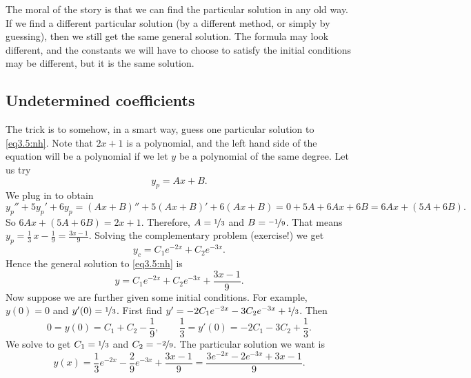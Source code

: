 The moral of the story is that we can find the particular solution in any old
way.  If we find a different particular solution (by a different method,
or simply by guessing),
then we still get the same general solution.
The formula may 
look different, and the constants we will have to choose to
satisfy
the initial conditions may be different, but it is the same solution.

\subsection{Undetermined coefficients}

The trick is to somehow, in a smart way, guess one particular solution to
\eqref{eq3.5:nh}.  Note that $2x+1$ is a polynomial, and the left hand 
side of the equation will be a polynomial if we let $y$ be a polynomial of
the same degree.  Let us try
\begin{equation*}
y_p = Ax + B .
\end{equation*}
We plug in to obtain
\begin{equation*}
y_p'' + 5y_p'+ 6y_p =
(Ax+B)'' + 5(Ax+B)' + 6(Ax+B) = 
0 + 5A + 6Ax + 6B = 6Ax+ (5A+6B) .
\end{equation*}
So $6Ax+(5A+6B) = 2x+1$.  Therefore, $A = \nicefrac{1}{3}$ and $B = \nicefrac{-1}{9}$.
That means
$y_p = \frac{1}{3}\, x - \frac{1}{9} = \frac{3x-1}{9}$.
Solving the complementary
problem (exercise!) we get
\begin{equation*}
y_c = C_1 e^{-2x} + C_2 e^{-3x}.
\end{equation*}
Hence the general solution to \eqref{eq3.5:nh} is
\begin{equation*}
y = C_1 e^{-2x} + C_2 e^{-3x} + \frac{3x-1}{9} .
\end{equation*}
Now suppose we are further given some initial conditions.  For example, $y(0) = 0$ and
$y'(0) = \nicefrac{1}{3}$.  First find $y' = - 2C_1 e^{-2x} - 3C_2 e^{-3x}
+ \nicefrac{1}{3}$.
Then
\begin{equation*}
0 = y(0) = C_1 + C_2 -\frac{1}{9} , \qquad
\frac{1}{3} = y'(0) = - 2C_1 - 3C_2 + \frac{1}{3} .
\end{equation*}
We solve to get $C_1 = \nicefrac{1}{3}$ and $C_2 = \nicefrac{-2}{9}$.
The particular solution we want is
\begin{equation*}
y(x) = \frac{1}{3} e^{-2x} - \frac{2}{9} e^{-3x} + \frac{3x-1}{9} =
\frac{3 e^{-2x} - 2 e^{-3x} + 3x-1}{9} .
\end{equation*}

